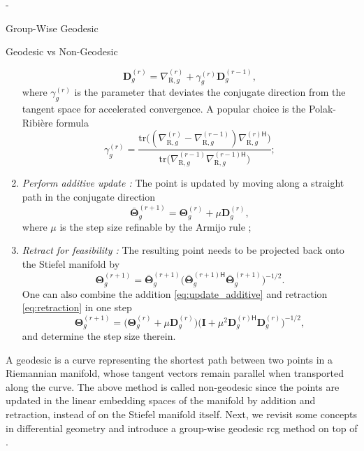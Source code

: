 \begin{section}{-}
\begin{subsection}{Group-Wise Geodesic }
\begin{subsubsection}{Geodesic vs Non-Geodesic }
\begin{enumerate}
				\begin{equation}
					\mathbf{D}_g^{(r)} = \nabla_{\mathrm{R},g}^{(r)} + \gamma_g^{(r)} \mathbf{D}_g^{(r-1)}, %
					\label{eq:direction_cg}
				\end{equation}
				where $\gamma_g^{(r)}$ is the parameter that deviates the conjugate direction from the tangent space for accelerated convergence. A popular choice is the Polak-Ribi\`{e}re formula
				\begin{equation}
					\gamma_g^{(r)} = \frac{\mathrm{tr}\bigl((\nabla_{\mathrm{R},g}^{(r)} - \nabla_{\mathrm{R},g}^{(r-1)}) {\nabla_{\mathrm{R},g}^{(r)\mathsf{H}}}\bigr)}{\mathrm{tr}\bigl(\nabla_{\mathrm{R},g}^{(r-1)} {\nabla_{\mathrm{R},g}^{(r-1)\mathsf{H}}}\bigr)}; %
					\label{eq:parameter_cg}
				\end{equation}
				\item \emph{Perform additive update \cite{Pan2022d}:} The point is updated by moving along a straight path in the conjugate direction
				\begin{equation}
					\bar{\mathbf{\Theta}}_g^{(r+1)} = \mathbf{\Theta}_g^{(r)} + \mu \mathbf{D}_g^{(r)},
					\label{eq:update_additive}
				\end{equation}
				where $\mu$ is the step size refinable by the Armijo rule \cite{Armijo1966};
				\item \emph{Retract for feasibility \cite{Absil2009,Li2023b}:} The resulting point needs to be projected back onto the Stiefel manifold by
				\begin{equation}
					\mathbf{\Theta}_g^{(r+1)} = \bar{\mathbf{\Theta}}_g^{(r+1)} \bigl({\bar{\mathbf{\Theta}}_g^{(r+1)\mathsf{H}}} \bar{\mathbf{\Theta}}_g^{(r+1)}\bigr)^{-1/2}.
					\label{eq:retraction}
				\end{equation}
				One can also combine the addition \eqref{eq:update_additive} and retraction \eqref{eq:retraction} in one step
				\begin{equation}
					\mathbf{\Theta}_g^{(r+1)} = \bigl(\mathbf{\Theta}_g^{(r)} + \mu \mathbf{D}_g^{(r)}\bigr) \bigl( \mathbf{I} + \mu^2 {\mathbf{D}_g^{(r)\mathsf{H}}} \mathbf{D}_g^{(r)} \bigr)^{-1/2},
					\label{eq:add_then_retract}
				\end{equation}
				and determine the step size therein.
			\end{enumerate}

			A geodesic is a curve representing the shortest path between two points in a Riemannian manifold, whose tangent vectors remain parallel when transported along the curve.
			The above method is called non-geodesic since the points are updated in the linear embedding spaces of the manifold by addition and retraction, instead of on the Stiefel manifold itself.
			Next, we revisit some concepts in differential geometry and introduce a group-wise geodesic \gls{rcg} method on top of \cite{Abrudan2008,Abrudan2009}.


\end{subsubsection}
\end{subsection}
\end{section}
